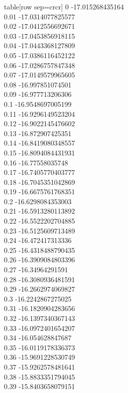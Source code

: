   table[row sep=crcr]{%
0	-17.015268435164\\
0.01	-17.0314077825577\\
0.02	-17.0412556692671\\
0.03	-17.0453856918115\\
0.04	-17.0443368127809\\
0.05	-17.0386116452122\\
0.06	-17.0286757847348\\
0.07	-17.0149579965605\\
0.08	-16.997851074501\\
0.09	-16.977713206306\\
0.1	-16.9548697005199\\
0.11	-16.9296149523204\\
0.12	-16.9022145476602\\
0.13	-16.872907425351\\
0.14	-16.8419080348557\\
0.15	-16.8094084431931\\
0.16	-16.77558035748\\
0.17	-16.7405770403777\\
0.18	-16.7045351042869\\
0.19	-16.6675761768351\\
0.2	-16.6298084353003\\
0.21	-16.5913280113892\\
0.22	-16.5522202704885\\
0.23	-16.5125609713489\\
0.24	-16.472417313336\\
0.25	-16.4318488790435\\
0.26	-16.3909084803396\\
0.27	-16.34964291591\\
0.28	-16.3080936481591\\
0.29	-16.2662974069827\\
0.3	-16.2242867275025\\
0.31	-16.1820904283656\\
0.32	-16.1397340367143\\
0.33	-16.0972401654207\\
0.34	-16.054628847687\\
0.35	-16.0119178336373\\
0.36	-15.9691228530749\\
0.37	-15.9262578481641\\
0.38	-15.8833351794045\\
0.39	-15.8403658079151\\
}
